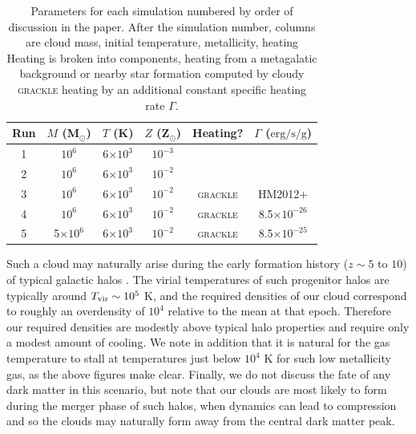\documentclass[useAMS,usenatbib]{mn2e}
\begin{document}
\begin{table}
       \begin{center}
	\begin{tabular}{@{}cccccc}
	\hline
	Run & $M$ (M$_{\odot}$) & $T$ (K) & $Z$ (Z$_{\odot}$) & Heating? & $\Gamma$ ($\mathrm{erg/s/g}$)\\ 
	\hline
	    1 & $10^6$ & 6$ \times 10^3$ & $10^{-3}$ \\
        2 & $10^6$ & 6$ \times 10^3$ & $10^{-2}$ \\
        3 & $10^6$ & 6$ \times 10^3$ & $10^{-2}$ & \textsc{grackle} & HM2012+ \\ 
        4 & $10^6$ & 6$ \times 10^3$ & $10^{-2}$ & \textsc{grackle} & 8.5$ \times 10^{-26}$\\ 
        5 & 5$\times 10^6$ & 6$ \times 10^3$ & $10^{-2}$ & \textsc{grackle} & 8.5$ \times 10^{-25}$\\ 
       \hline
	\end{tabular}
	\caption{Parameters for each simulation numbered by order of discussion in the paper.  After the simulation number, columns are cloud mass, initial temperature, metallicity, heating  Heating is broken into components, heating from
    a metagalatic background or nearby star formation computed by cloudy \textsc{grackle} heating by an additional constant specific heating rate $\Gamma$.}
	\label{table:parameters}
	\end{center}
\end{table}

Such a cloud may naturally arise during the early formation history ($z \sim 5$ to $10$)
of typical galactic halos \citep{Kim2017}.  The virial temperatures of such progenitor halos are
typically around $T_{\rm vir} \sim 10^{5}$ K, and the required densities of our cloud
correspond to roughly an overdensity of $10^4$ relative to the mean at that epoch.
Therefore our required densities are modestly above typical halo properties and require
only a modest amount of cooling.  We note in addition that it is natural for the gas
temperature to stall at temperatures just below $10^4$ K for such low metallicity gas,
as the above figures make clear.  Finally, we do not discuss the fate of any dark matter 
in this scenario, but note that our clouds are most likely to form during the merger
phase of such halos, when dynamics can lead to compression and so the clouds may
naturally form away from the central dark matter peak.
\end{document}
